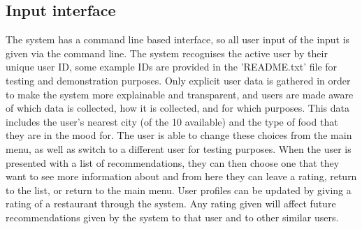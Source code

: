 \documentclass[conference]{IEEEtran}
\begin{document}
\subsection{Input interface}
The system has a command line based interface, so all user input of the input is given via the command line. 
The system recognises the active user by their unique user ID, some example IDs are provided in the 'README.txt' 
file for testing and demonstration purposes. 
Only explicit user data is gathered in order to make the system more explainable and transparent, 
and users are made aware of which data is collected, how it is collected, and for which purposes. 
This data includes the user's nearest city (of the 10 available) and the type of food that 
they are in the mood for. 
The user is able to change these choices from the main menu, as well as switch to a different user 
for testing purposes. 
When the user is presented with a list of recommendations, they can then choose one that they want 
to see more information about and from here they can leave a rating, return to the list, or return to 
the main menu. 
User profiles can be updated by giving a rating of a restaurant through the system. 
Any rating given will affect future recommendations given by the system to that user 
and to other similar users. 
\end{document}
